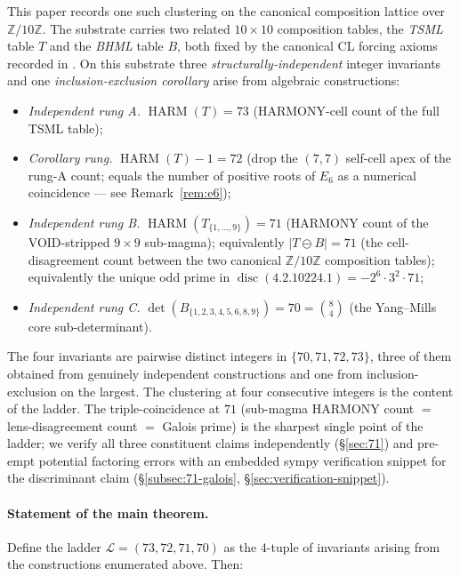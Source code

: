 \documentclass[11pt,reqno]{amsart}
\theoremstyle{definition}
\newcommand{\Z}{\mathbb{Z}}
\DeclareMathOperator{\HARM}{HARM}
\DeclareMathOperator{\disc}{disc}
\begin{document}
This paper records one such clustering on the canonical composition
lattice over $\Z/10\Z$. The substrate carries two related
$10 \times 10$ composition tables, the \emph{TSML} table $T$ and the
\emph{BHML} table $B$, both fixed by the canonical CL forcing axioms
recorded in \cite{Sanders2026CLAxioms}. On this substrate three
\emph{structurally-independent} integer invariants and one
\emph{inclusion-exclusion corollary} arise from algebraic constructions:
\begin{itemize}[leftmargin=*]
\item \emph{Independent rung A.} $\HARM(T) = 73$ (HARMONY-cell count
  of the full TSML table);
\item \emph{Corollary rung.} $\HARM(T) - 1 = 72$ (drop the $(7,7)$
  self-cell apex of the rung-A count; equals the number of positive
  roots of $E_6$ as a numerical coincidence — see
  Remark~\ref{rem:e6});
\item \emph{Independent rung B.} $\HARM(T_{\{1,\ldots,9\}}) = 71$
  (HARMONY count of the VOID-stripped $9 \times 9$ sub-magma);
  equivalently $|T \ominus B| = 71$ (the cell-disagreement count
  between the two canonical $\Z/10\Z$ composition tables);
  equivalently the unique odd prime in
  $\disc(4.2.10224.1) = -2^{6} \cdot 3^{2} \cdot 71$;
\item \emph{Independent rung C.} $\det(B_{\{1,2,3,4,5,6,8,9\}}) = 70 = \binom{8}{4}$
  (the Yang--Mills core sub-determinant).
\end{itemize}

The four invariants are pairwise distinct integers in
$\{70, 71, 72, 73\}$, three of them obtained from genuinely independent
constructions and one from inclusion-exclusion on the largest. The
clustering at four consecutive integers is the content of the ladder.
The triple-coincidence at $71$ (sub-magma HARMONY count $=$
lens-disagreement count $=$ Galois prime) is the sharpest single point
of the ladder; we verify all three constituent claims independently
(§\ref{sec:71}) and pre-empt potential factoring errors with an
embedded sympy verification snippet for the discriminant claim
(§\ref{subsec:71-galois}, §\ref{sec:verification-snippet}).

\paragraph{Statement of the main theorem.}

Define the ladder $\mathcal{L} = (73, 72, 71, 70)$ as the
$4$-tuple of invariants arising from the constructions enumerated
above. Then:
\end{document}
